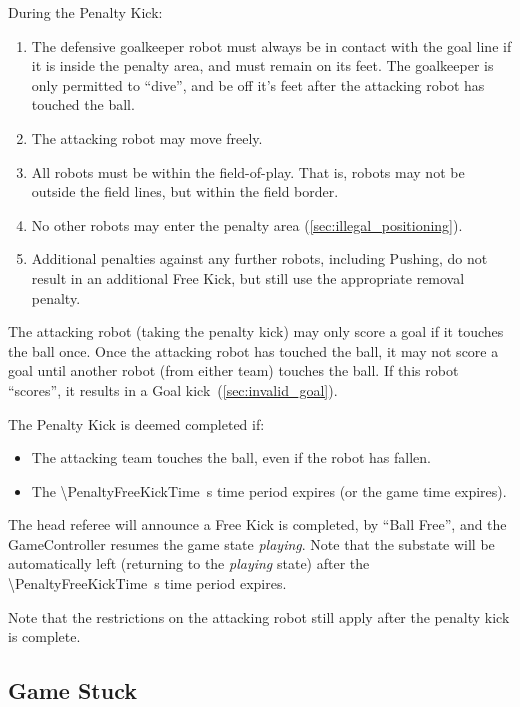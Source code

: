 During the Penalty Kick:
\begin{enumerate}
    \item The defensive goalkeeper robot must always be in contact with the goal line if it is inside the penalty area, and must remain on its feet. The goalkeeper is only permitted to ``dive'', and be off it's feet after the attacking robot has touched the ball.
    \item The attacking robot may move freely.
    \item All robots must be within the field-of-play. That is, robots may not be outside the field lines, but within the field border.
    \item No other robots may enter the penalty area (\cf \cref{sec:illegal_positioning}).
    \item Additional penalties against any further robots, including Pushing, do not result in an additional Free
    Kick, but still use the appropriate removal penalty.
\end{enumerate}

The attacking robot (taking the penalty kick) may only score a goal if it touches the ball once.
Once the attacking robot has touched the ball, it may not score a goal until another robot (from either team) touches the ball.
If this robot ``scores'', it results in a Goal kick~(\cf \cref{sec:invalid_goal}).

The Penalty Kick is deemed completed if:
\begin{itemize}
\item The attacking team touches the ball, even if the robot has fallen.
\item The \qty{\PenaltyFreeKickTime}{\second} time period expires (or the game time expires).
\end{itemize}

The head referee will announce a Free Kick is completed, by ``Ball Free'', and the GameController
resumes the game state \emph{playing}. Note that the substate will be automatically left (returning to the \textit{playing} state) after the \qty{\PenaltyFreeKickTime}{\second} time period expires.

Note that the restrictions on the attacking robot still apply after the penalty kick is complete.

\subsection{Game Stuck}
\label{sec:game_stuck}

